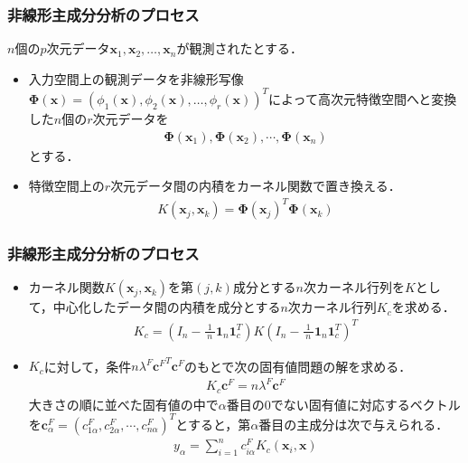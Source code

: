 \documentclass[dvipdfmx,cjk]{beamer}
\theoremstyle{example}
\begin{document}
\begin{frame}
    \frametitle{非線形主成分分析のプロセス}
    $n$個の$p$次元データ$\boldsymbol{x}_1,\boldsymbol{x}_2,\dots,\boldsymbol{x}_n$が観測されたとする．
    \begin{itemize}
        \item 入力空間上の観測データを非線形写像$\boldsymbol{\Phi}(\boldsymbol{x})=\left(\phi_1(\boldsymbol{x}),\phi_2(\boldsymbol{x}),\dots,\phi_r(\boldsymbol{x})\right)^T$によって高次元特徴空間へと変換した$n$個の$r$次元データを
              \begin{align*}
                  \boldsymbol{\Phi}(\boldsymbol{x}_1),\boldsymbol{\Phi}(\boldsymbol{x}_2),\cdots,\boldsymbol{\Phi}(\boldsymbol{x}_n)
              \end{align*}とする．
        \item 特徴空間上の$r$次元データ間の内積をカーネル関数で置き換える．
              \begin{align*}
                  K(\boldsymbol{x}_j,\boldsymbol{x}_k)={\boldsymbol{\Phi}(\boldsymbol{x}_j)}^T\boldsymbol{\Phi}(\boldsymbol{x}_k)
              \end{align*}
    \end{itemize}
\end{frame}
\begin{frame}
    \frametitle{非線形主成分分析のプロセス}
    \begin{itemize}
        \item カーネル関数$K(\boldsymbol{x}_j,\boldsymbol{x}_k)$を第$(j,k)$成分とする$n$次カーネル行列を$K$として，中心化したデータ間の内積を成分とする$n$次カーネル行列$K_c$を求める．
              \begin{align*}
                  K_c=\left(I_n-\frac{1}{\;n\;}\boldsymbol{1}_n\boldsymbol{1}_c^T\right)K\left(I_n-\frac{1}{\;n\;}\boldsymbol{1}_n\boldsymbol{1}_c^T\right)^T
              \end{align*}
        \item $K_c$に対して，条件$n\lambda^F{\boldsymbol{c}^F}^T\boldsymbol{c}^F$のもとで次の固有値問題の解を求める．
              \begin{align*}
                  K_c\boldsymbol{c}^F=n\lambda^F\boldsymbol{c}^F
              \end{align*}
              大きさの順に並べた固有値の中で$\alpha$番目の$0$でない固有値に対応するベクトルを$\boldsymbol{c}_\alpha^F=(c_{1\alpha}^F,c_{2\alpha}^F,\cdots,c_{n\alpha}^F)^T$とすると，第$\alpha$番目の主成分は次で与えられる．
              \begin{align*}
                  y_\alpha=\sum_{i=1}^{n}c_{i\alpha}^FK_c(\boldsymbol{x}_i,\boldsymbol{x})
              \end{align*}

    \end{itemize}

\end{frame}
\end{document}
